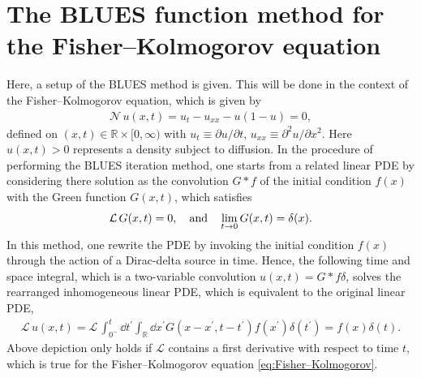 \documentclass[amsmath,amssymb,amsfonts,aps,pre,preprint,superscriptaddress,bibnotes,showpacs,showkeys,longbibliography]{revtex4-1}
\newcommand*{\lop}{\mathcal{L}\,}
\newcommand*{\nlop}{\mathcal{N}\,}
\begin{document}
\section{The BLUES function method for the Fisher–Kolmogorov equation}\label{sec:BLUES_method_pde}
Here, a setup of the BLUES method is given. This will be done in the context of the Fisher–Kolmogorov equation, which is given by
\begin{align}\label{eq:Fisher–Kolmogorov}
    \nlop u(x,t)=u_t - u_{xx} -u(1-u)=0,
\end{align}
defined on $(x,t) \in \mathbb{R} \times [0,\infty)$ with $u_t\equiv\partial u / \partial t$,  $u_{xx}\equiv\partial^2 u / \partial x^2$. Here $u(x,t)>0$ represents a density subject to diffusion. In the procedure of performing the BLUES iteration method, one starts from a related linear PDE by considering there solution as the convolution $G*f$ of the initial condition $f(x)$ with the Green function $G(x,t)$, which satisfies
\begin{align}
    \label{eq:linear_operator_delta_G}
    \lop G(x,t)=0, \qq{and} \lim_{t\to 0}G(x,t)=\delta(x).
\end{align}
In this method, one rewrite the PDE by invoking the initial condition $f(x)$ through the action of a Dirac-delta source in time. Hence, the following time and space integral, which is a two-variable convolution $u(x, t) = G \ast f \delta$, solves the rearranged inhomogeneous linear PDE, which is equivalent to the original linear PDE,
\begin{align}
 \label{eq:rewriten_linear_operator_delta_u}
	\lop u(x, t)=\lop \int_{0^{-}}^{t} \dd{t^{\prime}} \int_{\mathbb{R}} \dd{x^{\prime}} G\left(x-x^{\prime}, t-t^{\prime}\right) f\left(x^{\prime}\right) \delta\left(t^{\prime}\right)=f(x) \delta(t).
\end{align}
Above depiction only holds if $\mathcal{L}$ contains a first derivative with respect to time $t$, which is true for the Fisher–Kolmogorov equation \eqref{eq:Fisher–Kolmogorov}. 
\end{document}
